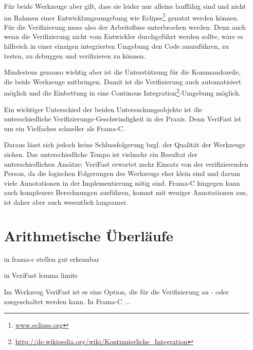 Für beide Werkzeuge aber gilt, dass sie leider nur alleine lauffähig sind und nicht im Rahmen
einer Entwicklungsumgebung wie Eclipse\footnote{\url{www.eclipse.org}} genutzt werden können. 
Für die Verifizierung muss also der Arbeitsfluss unterbrochen werden. Denn auch wenn die Verifizierung
nicht vom Entwickler durchgeführt werden sollte, wäre es hilfreich in einer einzigen integrierten Umgebung
den Code auszuführen, zu testen, zu debuggen und verifizieren zu können.

Mindestens genauso wichtig aber ist die Unterstützung für die Kommandozeile, die beide Werkzeuge
mitbringen. Damit ist die Verifizierung auch automatisiert möglich und die Einbettung in eine
Continous Integration\footnote{\url{http://de.wikipedia.org/wiki/Kontinuierliche_Integration}}-Umgebung möglich.

Ein wichtiger Unterschied der beiden Untersuchungsobjekte ist die unterschiedliche Verifizierungs-Geschwindigkeit
in der Praxis. Denn VeriFast ist um ein Vielfaches schneller\cite[Kap. 3]{jac10-1} als Frama-C. 

Daraus lässt sich jedoch keine Schlussfolgerung bzgl. der Qualität der Werkzeuge ziehen. Das unterschiedliche Tempo ist 
vielmehr ein Resultat der unterschiedlichen Ansätze: VeriFast erwartet mehr Einsatz von der verifizierenden Person, da
die logischen Folgerungen des Werkzeugs eher klein sind und darum viele Annotationen in der Implementierung nötig sind.
Frama-C hingegen kann auch komplexere Berechnungen ausführen, kommt mit weniger Annotationen aus, ist daher aber auch
wesentlich langsamer.


\section{Arithmetische Überläufe}
\label{sec:implementation:overflows}

in frama-c stellen gut erkennbar

in VeriFast lemma limits

 Im Werkzeug VeriFast
ist es eine Option, die für die Verifizierung an - oder ausgeschaltet werden kann. In Frama-C ... 
